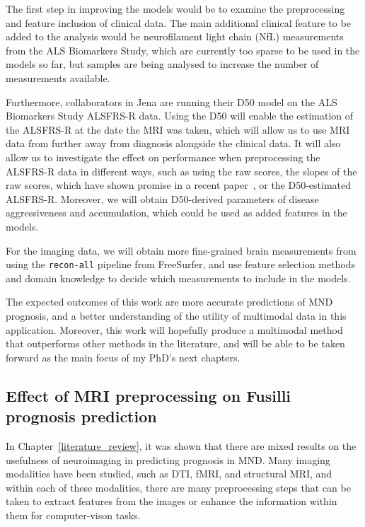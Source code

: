 The first step in improving the models would be to examine the preprocessing and feature inclusion of clinical data.
The main additional clinical feature to be added to the analysis would be neurofilament light chain (NfL) measurements from the ALS Biomarkers Study, which are currently too sparse to be used in the models so far, but samples are being analysed to increase the number of measurements available.

Furthermore, collaborators in Jena are running their D50 model on the ALS Biomarkers Study ALSFRS-R data.
Using the D50 will enable the estimation of the ALSFRS-R at the date the MRI was taken, which will allow us to use MRI data from further away from diagnosis alongside the clinical data.
It will also allow us to investigate the effect on performance when preprocessing the ALSFRS-R data in different ways, such as using the raw scores, the slopes of the raw scores, which have shown promise in a recent paper~\cite{papaizEnsembleimbalancebasedClassificationAmyotrophic2024}, or the D50-estimated ALSFRS-R.
Moreover, we will obtain D50-derived parameters of disease aggressiveness and accumulation, which could be used as added features in the models.

For the imaging data, we will obtain more fine-grained brain measurements from using the \texttt{recon-all} pipeline from FreeSurfer, and use feature selection methods and domain knowledge to decide which measurements to include in the models.

The expected outcomes of this work are more accurate predictions of MND prognosis, and a better understanding of the utility of multimodal data in this application.
Moreover, this work will hopefully produce a multimodal method that outperforms other methods in the literature, and will be able to be taken forward as the main focus of my PhD's next chapters.

\subsection{Effect of MRI preprocessing on Fusilli prognosis prediction}

In Chapter~\ref{literature_review}, it was shown that there are mixed results on the usefulness of neuroimaging in predicting prognosis in MND.
Many imaging modalities have been studied, such as DTI, fMRI, and structural MRI, and within each of these modalities, there are many preprocessing steps that can be taken to extract features from the images or enhance the information within them for computer-vison tasks.

